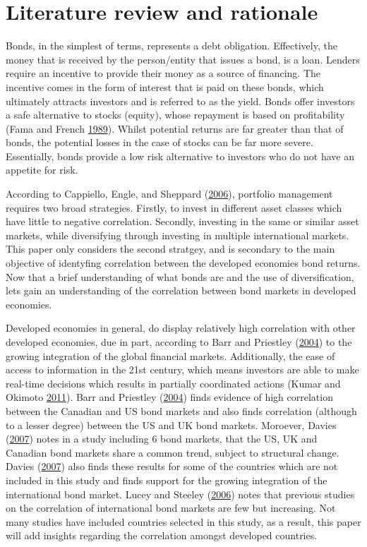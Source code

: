 \documentclass[11pt,preprint, authoryear]{elsarticle}
\numberwithin{equation}{section}
\numberwithin{figure}{section}
\numberwithin{table}{section}
\begin{document}
\section{\texorpdfstring{Literature review and rationale
\label{lit_review}}{Literature review and rationale }}\label{literature-review-and-rationale}

Bonds, in the simplest of terms, represents a debt obligation.
Effectively, the money that is received by the person/entity that issues
a bond, is a loan. Lenders require an incentive to provide their money
as a source of financing. The incentive comes in the form of interest
that is paid on these bonds, which ultimately attracts investors and is
referred to as the yield. Bonds offer investors a safe alternative to
stocks (equity), whose repayment is based on profitability (Fama and
French \protect\hyperlink{ref-FRENCH}{1989}). Whilst potential returns
are far greater than that of bonds, the potential losses in the case of
stocks can be far more severe. Essentially, bonds provide a low risk
alternative to investors who do not have an appetite for risk.

According to Cappiello, Engle, and Sheppard
(\protect\hyperlink{ref-cappiello2006}{2006}), portfolio management
requires two broad strategies. Firstly, to invest in different asset
classes which have little to negative correlation. Secondly, investing
in the same or similar asset markets, while diversifying through
investing in multiple international markets. This paper only considers
the second stratgey, and is secondary to the main objective of
identyfing correlation between the developed economies bond returns. Now
that a brief understanding of what bonds are and the use of
diversification, lets gain an understanding of the correlation between
bond markets in developed economies.

Developed economies in general, do display relatively high correlation
with other developed economies, due in part, according to Barr and
Priestley (\protect\hyperlink{ref-barr2004}{2004}) to the growing
integration of the global financial markets. Additionally, the ease of
access to information in the 21st century, which means investors are
able to make real-time decisions which results in partially coordinated
actions (Kumar and Okimoto \protect\hyperlink{ref-kumar2011}{2011}).
Barr and Priestley (\protect\hyperlink{ref-barr2004}{2004}) finds
evidence of high correlation between the Canadian and US bond markets
and also finds correlation (although to a lesser degree) between the US
and UK bond markets. Moroever, Davies
(\protect\hyperlink{ref-davies2007}{2007}) notes in a study including 6
bond markets, that the US, UK and Canadian bond markets share a common
trend, subject to structural change. Davies
(\protect\hyperlink{ref-davies2007}{2007}) also finds these results for
some of the countries which are not included in this study and finds
support for the growing integration of the international bond market.
Lucey and Steeley (\protect\hyperlink{ref-lucey2006}{2006}) notes that
previous studies on the correlation of international bond markets are
few but increasing. Not many studies have included countries selected in
this study, as a result, this paper will add insights regarding the
correlation amongst developed countries.
\end{document}
